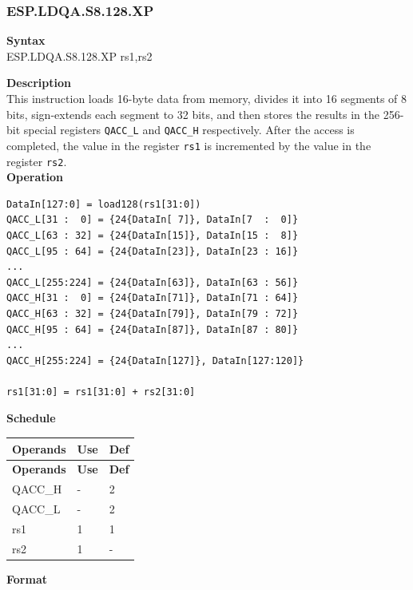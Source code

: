 \newpage
\subsubsection{ESP.LDQA.S8.128.XP}\label{instruction:ESPLDQAS8128XP}
\textbf{Syntax}\\
ESP.LDQA.S8.128.XP rs1,rs2

\textbf{Description}\\
This instruction loads 16-byte data from memory, divides it into 16 segments of 8 bits, sign-extends each segment to 32 bits, and then stores the results in the 256-bit special registers \lstinline{QACC_L} and \lstinline{QACC_H} respectively. After the access is completed, the value in the register \lstinline{rs1} is incremented by the value in the register \lstinline{rs2}.\\
\textbf{Operation}
\begin{lstlisting}
DataIn[127:0] = load128(rs1[31:0])
QACC_L[31 :  0] = {24{DataIn[ 7]}, DataIn[7  :  0]}
QACC_L[63 : 32] = {24{DataIn[15]}, DataIn[15 :  8]}
QACC_L[95 : 64] = {24{DataIn[23]}, DataIn[23 : 16]}
...
QACC_L[255:224] = {24{DataIn[63]}, DataIn[63 : 56]}
QACC_H[31 :  0] = {24{DataIn[71]}, DataIn[71 : 64]}
QACC_H[63 : 32] = {24{DataIn[79]}, DataIn[79 : 72]}
QACC_H[95 : 64] = {24{DataIn[87]}, DataIn[87 : 80]}
...
QACC_H[255:224] = {24{DataIn[127]}, DataIn[127:120]}

rs1[31:0] = rs1[31:0] + rs2[31:0]
\end{lstlisting}

\textbf{Schedule}\\
\begin{longtable}[c]{|l|l|l|}
    \hline
    \rowcolor{lightgray}
    \textbf{Operands} & \textbf{Use} & \textbf{Def} \\\hline
    \endfirsthead
    \hline
    \rowcolor{lightgray}
     \textbf{Operands} & \textbf{Use} & \textbf{Def} \\\hline
    \endhead
    \hline
    \endfoot

  QACC\_H & - & 2 \\\hline
    QACC\_L & - & 2 \\\hline
  rs1 & 1 & 1 \\\hline
  rs2 & 1 & -

\end{longtable}

\textbf{Format}\\

